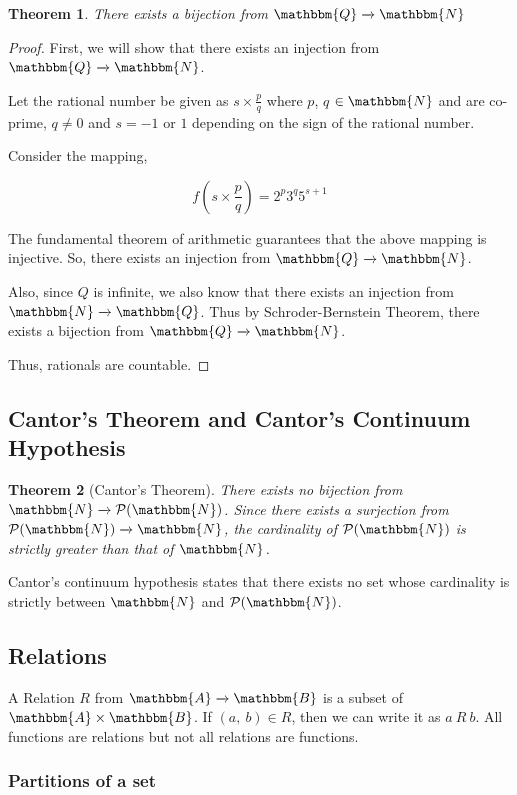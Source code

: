 \documentclass[14pt]{extarticle}
\newcommand{\impl}{\xrightarrow{}}
\newcommand{\N}{\mathbbm{N}}
\newcommand{\Q}{\mathbbm{Q}}
\newcommand{\A}{\mathbbm{A}}
\newcommand{\B}{\mathbbm{B}}
\newcommand{\powerset}{\mathcal{P}}
\newtheorem{theorem}{Theorem}
\begin{document}
\begin{theorem}
    There exists a bijection from $\Q \impl \N$
\end{theorem}

\begin{proof}
    First, we will show that there exists an injection from \\ $\Q \impl \N$.

    Let the rational number be given as $s \times \frac{p}{q}$ where $p$, $q$ $\in \N$ and are co-prime, $q \neq 0$ and $s = -1$ or $1$ depending on the sign of the rational number.

    Consider the mapping,

    \[
        f(s \times \frac{p}{q}) = 2^p3^q5^{s+1}
    \]

    The fundamental theorem of arithmetic guarantees that the above mapping is injective. So, there exists an injection from $\Q \impl \N$.

    Also, since $Q$ is infinite, we also know that there exists an injection from $\N \impl \Q$. Thus by Schroder-Bernstein Theorem, there exists a bijection from $\Q \impl \N$.

    Thus, rationals are countable.
\end{proof}

\subsection{Cantor's Theorem and Cantor's Continuum Hypothesis}

\begin{theorem}[Cantor's Theorem]
    There exists no bijection from $\N \impl \powerset(\N)$. Since there exists a surjection from $\powerset(\N) \impl \N$, the cardinality of $\powerset{(\N)}$ is strictly greater than that of $\N$.
\end{theorem}

Cantor's continuum hypothesis states that there exists no set whose cardinality is strictly between $\N$ and $\powerset(\N)$.


\subsection{Relations}

A Relation $R$ from $\A \impl \B$ is a subset of $\A \times \B$. If $(a, \ b) \in R$, then we can write it as $a \ R \ b$. All functions are relations but not all relations are functions.

\subsubsection{Partitions of a set}
\end{document}
